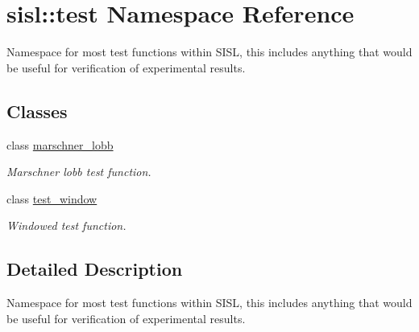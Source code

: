 \hypertarget{namespacesisl_1_1test}{}\section{sisl\+:\+:test Namespace Reference}
\label{namespacesisl_1_1test}


Namespace for most test functions within S\+I\+SL, this includes anything that would be useful for verification of experimental results.  


\subsection*{Classes}
\begin{DoxyCompactItemize}
\item 
class \hyperlink{classsisl_1_1test_1_1marschner__lobb}{marschner\+\_\+lobb}
\begin{DoxyCompactList}\small\item\em Marschner lobb test function. \end{DoxyCompactList}\item 
class \hyperlink{classsisl_1_1test_1_1test__window}{test\+\_\+window}
\begin{DoxyCompactList}\small\item\em Windowed test function. \end{DoxyCompactList}\end{DoxyCompactItemize}


\subsection{Detailed Description}
Namespace for most test functions within S\+I\+SL, this includes anything that would be useful for verification of experimental results. 